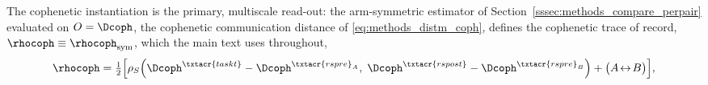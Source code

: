 %
%
The cophenetic instantiation is the primary, multiscale read-out: the arm-symmetric estimator of Section~\ref{sssec:methods_compare_perpair} evaluated on \(O = \Dcoph\), the cophenetic communication distance of \eqref{eq:methods_distm_coph}, defines the cophenetic trace of record, \(\rhocoph \equiv \rhocoph_{\mathrm{sym}}\), which the main text uses throughout,
\begin{equation}
    \rhocoph = \tfrac{1}{2}\Big[\rho_{S}\!\left(\Dcoph^{\txtacr{taskt}} - \Dcoph^{\txtacr{rspre}_{A}},\; \Dcoph^{\txtacr{rspost}} - \Dcoph^{\txtacr{rspre}_{B}}\right) + \big(A\!\leftrightarrow\!B\big)\Big],
    \label{eq:methods_rho_coph}
\end{equation}
